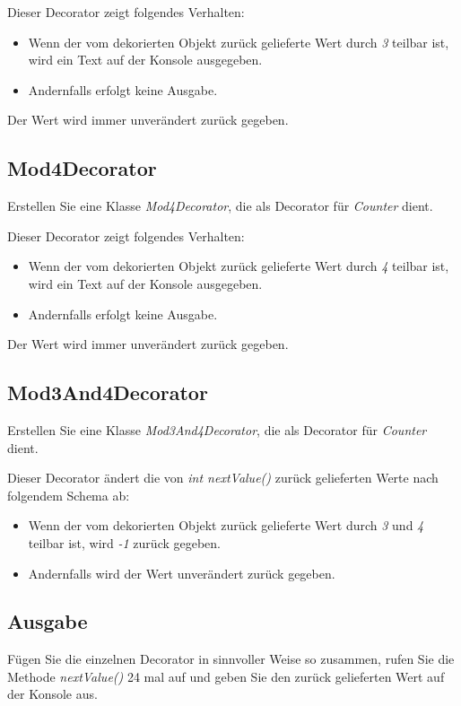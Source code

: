 \documentclass[oneside,a4paper]{scrartcl}
\begin{document}
Dieser Decorator zeigt folgendes Verhalten:

\begin{itemize}
\item Wenn der vom dekorierten Objekt zurück gelieferte Wert durch \emph{3} teilbar ist, wird ein Text auf der Konsole ausgegeben.
\item Andernfalls erfolgt keine Ausgabe.
\end{itemize}

 Der Wert wird immer unverändert zurück gegeben.


\subsection{Mod4Decorator}
Erstellen Sie eine Klasse \emph{Mod4Decorator}, die als Decorator für \emph{Counter} dient.

Dieser Decorator zeigt folgendes Verhalten:

\begin{itemize}
\item Wenn der vom dekorierten Objekt zurück gelieferte Wert durch \emph{4} teilbar ist, wird ein Text auf der Konsole ausgegeben.
\item Andernfalls erfolgt keine Ausgabe.
\end{itemize}

Der Wert wird immer unverändert zurück gegeben.



\subsection{Mod3And4Decorator}
Erstellen Sie eine Klasse \emph{Mod3And4Decorator}, die als Decorator für \emph{Counter} dient.

Dieser Decorator ändert die von \emph{int nextValue()} zurück gelieferten Werte nach
folgendem Schema ab:

\begin{itemize}
\item Wenn der vom dekorierten Objekt zurück gelieferte Wert durch \emph{3} und \emph{4} teilbar ist, wird \emph{-1} zurück gegeben.
\item Andernfalls wird der Wert unverändert zurück gegeben.
\end{itemize}


\subsection{Ausgabe}
Fügen Sie die einzelnen Decorator in sinnvoller Weise so zusammen, rufen Sie die Methode \emph{nextValue()}
24 mal auf und geben Sie den zurück gelieferten Wert auf der Konsole aus.
\end{document}
